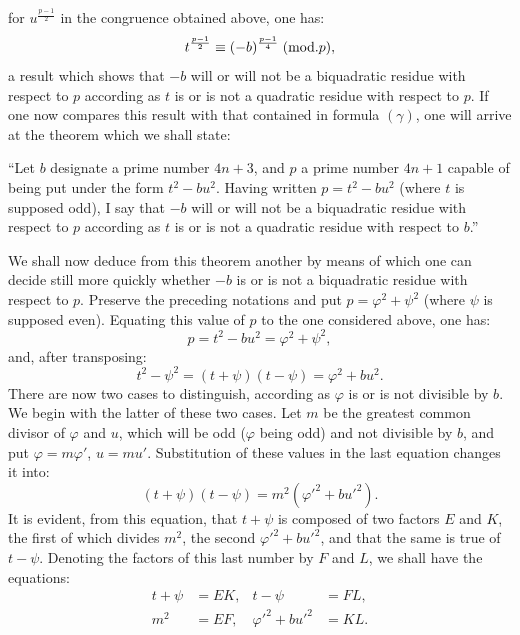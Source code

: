 \noindent
for $u^{\frac{p-1}{2}}$ in the congruence obtained above, one has:
\[
t^{\frac{p-1}{2}}\equiv(-b)^{\frac{p-1}{4}}\;(\mathrm{mod}.p),
\]
a result which shows that $-b$ will or will not be a biquadratic residue with
respect to $p$ according as $t$ is or is not a quadratic residue with respect to $p$.
If one now compares this result with that contained in formula $(\gamma)$, one will arrive at
the theorem which we shall state:
\par\indent
“Let $b$ designate a prime number $4n+3$, and $p$ a prime number $4n+1$ capable
of being put under the form $t^2-bu^2$. Having written $p=t^2-bu^2$ (where $t$
is supposed odd), I say that $-b$ will or will not be a biquadratic residue with
respect to $p$ according as $t$ is or is not a quadratic residue with respect to $b$.”
\par\indent
We shall now deduce from this theorem another by means of which one can
decide still more quickly whether $-b$ is or is not a biquadratic residue with
respect to $p$. Preserve the preceding notations and put $p=\varphi^2+\psi^2$
(where $\psi$ is supposed even). Equating this value of $p$ to the one considered
above, one has:
\[
p=t^2-bu^2=\varphi^2+\psi^2,
\]
and, after transposing:
\[
t^2-\psi^2=(t+\psi)(t-\psi)=\varphi^2+bu^2.
\]
There are now two cases to distinguish, according as $\varphi$ is or is not
divisible by $b$. We begin with the latter of these two cases. Let $m$ be the
greatest common divisor of $\varphi$ and $u$, which will be odd ($\varphi$ being odd)
and not divisible by $b$, and put $\varphi=m\varphi'$, $u=mu'$. Substitution of
these values in the last equation changes it into:
\[
(t+\psi)(t-\psi)=m^2(\varphi'^2+bu'^2).
\]
It is evident, from this equation, that $t+\psi$ is composed of two factors
$E$ and $K$, the first of which divides $m^2$, the second $\varphi'^2+bu'^2$,
and that the same is true of $t-\psi$. Denoting the factors of this last
number by $F$ and $L$, we shall have the equations:
\[
\begin{aligned}
t+\psi&=EK, &t-\psi&=FL,\\
m^2&=EF, &\varphi'^2+bu'^2&=KL.
\end{aligned}
\]

